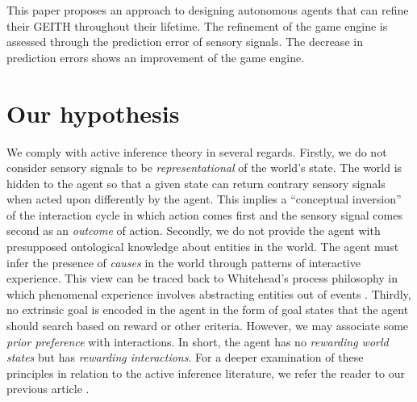 \documentclass[runningheads]{llncs}
\begin{document}
This paper proposes an approach to designing autonomous agents that can refine their GEITH throughout their lifetime.
The refinement of the game engine is assessed through 
the prediction error of sensory signals. 
The decrease in prediction errors shows an improvement of the game engine. 




\section{Our hypothesis}

We comply with active inference theory in several regards. 
Firstly, we do not consider sensory signals to be \textit{representational} of the world's state. 
The world is hidden to the agent so that a given state can return contrary sensory signals when acted upon differently by the agent.
This implies a ``conceptual inversion'' of the interaction cycle in which action comes first and the sensory signal comes second as an  \textit{outcome} of action. 
Secondly, we do not provide the agent with presupposed ontological knowledge about entities in the world. 
The agent must infer the 
presence of \textit{causes} in the world 
through patterns of interactive experience. 
This view can be traced back to Whitehead's process philosophy in which phenomenal experience involves abstracting entities out of events \cite{whitehead1929}. 
Thirdly, no extrinsic goal is encoded in the agent in the form of goal states that the agent should search based on reward or other criteria. 
However, we may associate some \textit{prior preference} with interactions. 
In short, the agent has no \textit{rewarding world states} but has \textit{rewarding interactions}. %
For a deeper examination of these principles in relation to the active inference literature, we refer the reader to our previous article \cite{georgeon_artificial_2024}.
\end{document}
